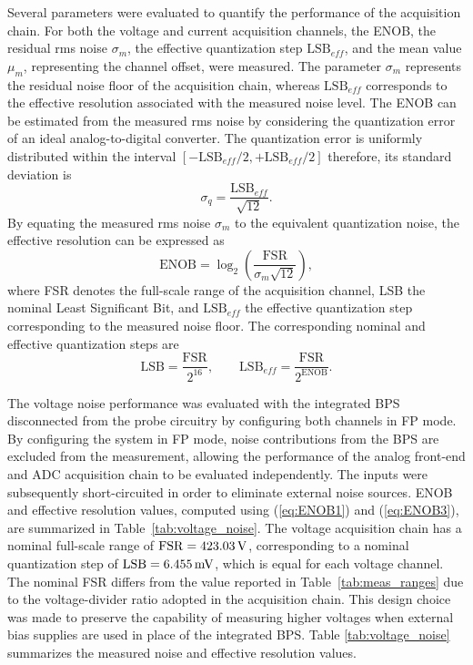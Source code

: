 Several parameters were evaluated to quantify the performance of the acquisition chain. For both the voltage and current acquisition channels, the ENOB, the residual rms noise $\sigma_m$, the effective quantization step $\mathrm{LSB}_{eff}$, and the mean value $\mu_m$, representing the channel offset, were measured. The parameter $\sigma_m$ represents the residual noise floor of the acquisition chain, whereas $\mathrm{LSB}_{eff}$ corresponds to the effective resolution associated with the measured noise level. The ENOB can be estimated from the measured rms noise by considering the quantization error of an ideal analog-to-digital converter. The quantization error is uniformly distributed within the interval $\left[-\mathrm{LSB}_{eff}/2, +\mathrm{LSB}_{eff}/2\right]$ therefore, its standard deviation is
\begin{equation}
	\sigma_q = \frac{\mathrm{LSB}_{eff}}{\sqrt{12}}.
	\label{eq:ENOB1}
\end{equation}
By equating the measured rms noise $\sigma_m$ to the equivalent quantization noise, the effective resolution can be expressed as
\begin{equation}
	\mathrm{ENOB} = \log_2\left(\frac{\mathrm{FSR}}{\sigma_{m}\sqrt{12}}\right),
	\label{eq:ENOB2}
\end{equation}
where FSR denotes the full-scale range of the acquisition channel, LSB the nominal Least Significant Bit, and $\mathrm{LSB}_{eff}$ the effective quantization step corresponding to the measured noise floor. The corresponding nominal and effective quantization steps are
\begin{equation}
	\mathrm{LSB} = \frac{\mathrm{FSR}}{2^{16}}, \qquad \mathrm{LSB}_{eff} = \frac{\mathrm{FSR}}{2^{\mathrm{ENOB}}}.
	\label{eq:ENOB3}
\end{equation}

The voltage noise performance was evaluated with the integrated BPS disconnected from the probe circuitry by configuring both channels in FP mode. By configuring the system in FP mode, noise contributions from the BPS are excluded from the measurement, allowing the performance of the analog front-end and ADC acquisition chain to be evaluated independently. The inputs were subsequently short-circuited in order to eliminate external noise sources. ENOB and effective resolution values, computed using (\ref{eq:ENOB1}) and (\ref{eq:ENOB3}), are summarized in Table~\ref{tab:voltage_noise}. The voltage acquisition chain has a nominal full-scale range of $\mathrm{FSR}=423.03 \, \mathrm{V}$, corresponding to a nominal quantization step of $\mathrm{LSB}=6.455 \, \mathrm{mV}$, which is equal for each voltage channel. The nominal FSR differs from the value reported in Table~\ref{tab:meas_ranges} due to the voltage-divider ratio adopted in the acquisition chain. This design choice was made to preserve the capability of measuring higher voltages when external bias supplies are used in place of the integrated BPS. Table \ref{tab:voltage_noise} summarizes the measured noise and effective resolution values.

